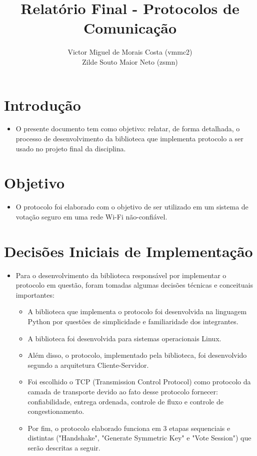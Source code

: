 \documentclass[10pt]{article}
\title{\Huge \textbf{Relatório Final - Protocolos de Comunicação}}
\author{
Victor Miguel de Morais Costa (vmmc2) \\
Zilde Souto Maior Neto (zsmn)
}
\date{}
\begin{document}
\maketitle

\section{Introdução}
    \begin{itemize}
    \item O presente documento tem como objetivo: relatar, de forma detalhada, o processo de desenvolvimento da biblioteca que implementa protocolo a ser usado no projeto final da disciplina.
    \end{itemize}

\section{Objetivo}
    \begin{itemize}
    \item O protocolo foi elaborado com o objetivo de ser utilizado em um sistema de votação seguro em uma rede Wi-Fi não-confiável.
    \end{itemize}

\section{Decisões Iniciais de Implementação}
    \begin{itemize}
    \item Para o desenvolvimento da biblioteca responsável por implementar o protocolo em questão, foram tomadas algumas decisões técnicas e conceituais importantes:
        \begin{itemize}
        \item A biblioteca que implementa o protocolo foi desenvolvida na linguagem Python por questões de simplicidade e familiaridade dos integrantes.
        \item A biblioteca foi desenvolvida para sistemas operacionais Linux.
        \item Além disso, o protocolo, implementado pela biblioteca, foi desenvolvido segundo a arquitetura Cliente-Servidor.
        \item Foi escolhido o TCP (Transmission Control Protocol) como protocolo da camada de transporte devido ao fato desse protocolo fornecer: confiabilidade, entrega ordenada, controle de fluxo e controle de congestionamento.
        \item Por fim, o protocolo elaborado funciona em 3 etapas sequenciais e distintas ("Handshake", "Generate Symmetric Key" e "Vote Session") que serão descritas a seguir.
        \end{itemize}
    \end{itemize}
\end{document}
